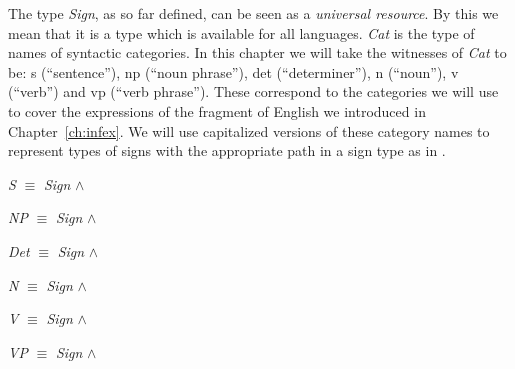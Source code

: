 The type \textit{Sign}, as so far defined, can be seen as a
\textit{universal resource}.  By this we mean that it is a type which
is available for all languages. 
\textit{Cat} is the type of names of syntactic categories.  In this chapter we
will take the witnesses of \textit{Cat} to be: s (``sentence''), np (``noun phrase''),
det (``determiner''), n (``noun''), v (``verb'') and vp (``verb
phrase'').  These correspond to the categories we will use to cover
the expressions of the fragment of English we introduced in
Chapter~\ref{ch:infex}. We will use capitalized versions of these
category names to represent types of signs with the appropriate path in a
sign type as in \nexteg{}.
\begin{ex} 
\begin{subex} 

\item \textit{S} $\equiv$ \textit{Sign} \d{$\wedge$} 
 
\item \textit{NP} $\equiv$  \textit{Sign} \d{$\wedge$}  
 
\item \textit{Det} $\equiv$
   \textit{Sign} \d{$\wedge$} 

\item \textit{N} $\equiv$
   \textit{Sign} \d{$\wedge$}  

\item \textit{V} $\equiv$
   \textit{Sign} \d{$\wedge$} 

\item \textit{VP} $\equiv$  \textit{Sign} \d{$\wedge$} 
 
\end{subex} 
\label{ex:catsigntypes}   
\end{ex}

